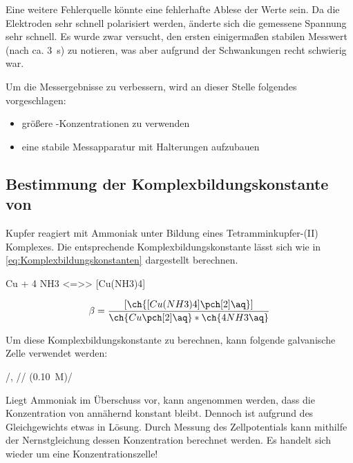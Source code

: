 \documentclass{article}
\begin{document}
        Eine weitere Fehlerquelle könnte eine fehlerhafte Ablese der Werte sein. Da die Elektroden sehr schnell polarisiert werden, änderte sich die gemessene Spannung sehr schnell. Es wurde zwar versucht, den ersten einigermaßen stabilen Messwert (nach ca. \SI[mode=text]{3}{\second}) zu notieren, was aber aufgrund der Schwankungen recht schwierig war.
        
        Um die Messergebnisse zu verbessern, wird an dieser Stelle folgendes vorgeschlagen: 
      
        \begin{itemize}
          \item größere -Konzentrationen zu verwenden
          \item eine stabile Messapparatur mit Halterungen aufzubauen
        \end{itemize}
     
      \pagebreak
        
      \subsection{Bestimmung der Komplexbildungskonstante von \ch{[Cu(NH3)4]\pch[2]}}
        
        Kupfer reagiert mit Ammoniak unter Bildung eines Tetramminkupfer-(II) Komplexes. Die entsprechende Komplexbildungskonstante lässt sich wie in \eqref{eq:Komplexbildungskonstanten} dargestellt berechnen.
        
        \begin{reaction}
          Cu\pch[2]\aq{} + 4 NH3\aq{} <=>> [Cu(NH3)4]\pch[2]\aq \label{rec:Komplexbilgun}
        \end{reaction}
        
        \begin{equation}
          \beta = \frac{[\ch{[Cu(NH3)4]\pch[2]\aq}]}{\ch{Cu\pch[2]\aq} * \ch{4 NH3\aq}} \label{eq:Komplexbildungskonstanten}
        \end{equation}
        
        Um diese Komplexbildungskonstante zu berechnen, kann folgende galvanische Zelle verwendet werden:
        
        \begin{center}
          /\ch{[Cu(NH3)4]\pch[2]\aq}, //  (\SI[mode=text]{0.10}{M})/
        \end{center}
        
        Liegt Ammoniak im Überschuss vor, kann angenommen werden, dass die Konzentration von \ch{[Cu(NH3)4]\pch[2]\aq} annähernd konstant bleibt. Dennoch ist aufgrund des Gleichgewichts etwas  in Lösung. Durch Messung des Zellpotentials kann mithilfe der Nernstgleichung dessen Konzentration berechnet werden. Es handelt sich wieder um eine Konzentrationszelle!
        
\end{document}
